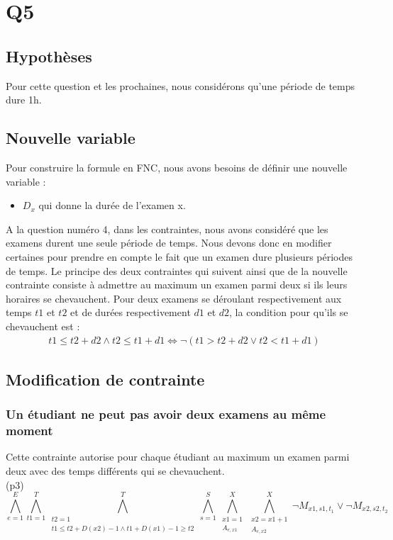 \documentclass[a4paper,11pt]{article}
\begin{document}
\section{Q5}

\subsection{Hypothèses}
Pour cette question et les prochaines, nous considérons qu'une période de temps dure 1h.

\subsection{Nouvelle variable}

Pour construire la formule en FNC, nous avons besoins de définir une nouvelle variable :  
\begin{itemize}
	\item \( D_{x}\) qui donne la durée de l'examen x.
\end{itemize}

A la question numéro 4, dans les contraintes, nous avons considéré que les examens durent une seule période de temps. Nous devons donc en modifier certaines pour prendre en compte le fait que un examen dure plusieurs périodes de temps. 
Le principe des deux contraintes qui suivent ainsi que de la nouvelle contrainte consiste à admettre au maximum un examen parmi deux si ils leurs horaires se chevauchent. Pour deux examens se déroulant respectivement aux temps $t1$ et $t2$ et de durées respectivement $d1$ et $d2$, la condition pour qu'ils se chevauchent est : 
\begin{align}
t1 \leq t2 + d2 \wedge t2 \leq t1 + d1
\iff \neg (t1 > t2 + d2 \vee t2 < t1 + d1)
\end{align}

\subsection{Modification de contrainte}

\subsubsection{Un étudiant ne peut pas avoir deux examens au même moment}
Cette contrainte autorise pour chaque étudiant au maximum un examen parmi deux avec des temps différents qui se chevauchent.\\
(p3)
\begin{displaymath}
\bigwedge\limits_{e=1}^{E}\bigwedge\limits_{t1=1}^{T}\bigwedge\limits_{\substack{t2=1 \\ t1 \leq t2 + D(x2)-1 \wedge t1 + D(x1)-1 \geq t2}}^{T}\bigwedge\limits_{s=1}^{S}\bigwedge\limits_{\substack{x1=1 \\ A_{e,x1}}}^{X}\bigwedge\limits_{\substack{x2=x1+1 \\ A_{e,x2}}}^{X} \neg M_{x1, s1, t_{1}} \vee \neg M_{x2, s2, t_{2}}
\end{displaymath}
\end{document}
